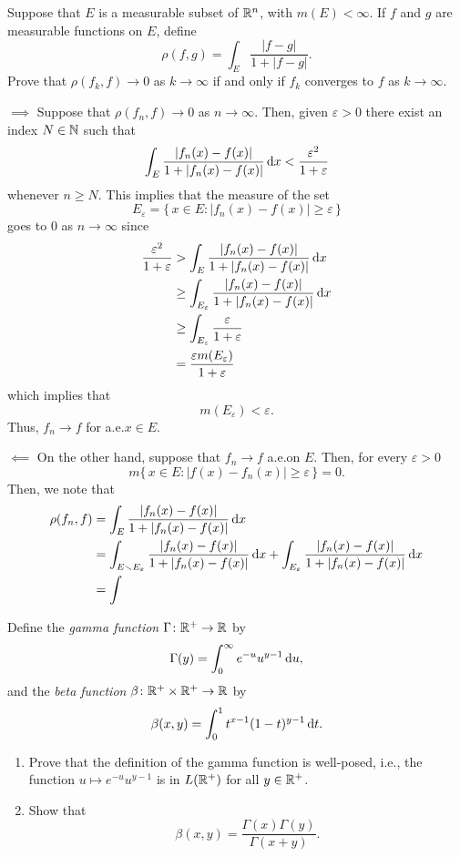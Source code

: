 \begin{problem}
  Suppose that \(E\) is a measurable subset of \(\mathbb{R}^n\), with
  \(m(E)<\infty\). If \(f\) and \(g\) are measurable functions on \(E\),
  define
  \[
    \rho(f,g)=\int_E\frac{|f-g|}{1+|f-g|}.
  \]
  Prove that \(\rho(f_k,f)\to 0\) as \(k\to\infty\) if and only if \(f_k\)
  converges to \(f\) as \(k\to\infty\).
\end{problem}
\begin{solution}
  \(\implies\) Suppose that \(\rho(f_n,f)\to 0\) as \(n\to\infty\). Then,
  given \(\varepsilon>0\) there exist an index \(N\in\mathbb{N}\) such that
  \[
    \int_E \frac{|f_n(x)-f(x)|}{1+|f_n(x)-f(x)|}\mathop{}\!\mathrm{d} x
    <\frac{\varepsilon^2}{1+\varepsilon}
  \]
  whenever \(n\geq N\). This implies that the measure of the set
  \[
    E_\varepsilon=\bigr\{\,x\in E:|f_n(x)-f(x)|\geq\varepsilon\,\bigl\}
  \]
  goes to \(0\) as \(n\to\infty\) since
  \begin{align*}
    \frac{\varepsilon^2}{1+\varepsilon}
    &>\int_E \frac{|f_n(x)-f(x)|}{1+|f_n(x)-f(x)|}\mathop{}\!\mathrm{d} x\\
    &\geq \int_{E_\varepsilon}
    \frac{|f_n(x)-f(x)|}{1+|f_n(x)-f(x)|}\mathop{}\!\mathrm{d} x\\
    &\geq\int_{E_\varepsilon}\frac{\varepsilon}{1+\varepsilon}\\
    &=\frac{\varepsilon m(E_\varepsilon)}{1+\varepsilon}
  \end{align*}
  which implies that
  \[
    m(E_\varepsilon)<\varepsilon.
  \]
  Thus, \(f_n\to f\) for a.e.\@ \(x\in E\).

  \(\impliedby\) On the other hand, suppose that \(f_n\to f\) a.e.\@ on
  \(E\). Then, for every \(\varepsilon>0\)
  \[
    m\bigl\{\,x\in E:|f(x)-f_n(x)|\geq\varepsilon\,\bigr\}=0.
  \]
  Then, we note that
  \begingroup
  \allowdisplaybreaks
  \begin{align*}
    \rho(f_n,f)
    &=\int_E \frac{|f_n(x)-f(x)|}{1+|f_n(x)-f(x)|}\mathop{}\!\mathrm{d} x\\
    &=\int_{E\smallsetminus E_\varepsilon} \frac{|f_n(x)-f(x)|}{1+|f_n(x)-f(x)|}\mathop{}\!\mathrm{d} x
      +\int_{E_\varepsilon} \frac{|f_n(x)-f(x)|}{1+|f_n(x)-f(x)|}\mathop{}\!\mathrm{d} x\\
    &=\int
  \end{align*}
  \endgroup
\end{solution}

\begin{problem}
  Define the \emph{gamma function} \(\Gamma\colon\mathbb{R}^+\to\mathbb{R}\) by
  \[
    \Gamma(y)=\int_0^\infty e^{-u}u^{y-1}\mathop{}\!\mathrm{d} u,
  \]
  and the \emph{beta function} \(\beta\colon\mathbb{R}^+\times\mathbb{R}^+\to\mathbb{R}\) by
  \[
    \beta(x,y)=\int_0^1 t^{x-1}(1-t)^{y-1}\mathop{}\!\mathrm{d} t.
  \]
  \begin{enumerate}[label=(\alph*)]
  \item Prove that the definition of the gamma function is well-posed,
    i.e., the function \(u\mapsto e^{-u}u^{y-1}\) is in \(L(\mathbb{R}^+)\) for
    all \(y\in\mathbb{R}^+\).
  \item Show that
    \[
      \beta(x,y)=\frac{\Gamma(x)\Gamma(y)}{\Gamma(x+y)}.
    \]
  \end{enumerate}
\end{problem}
\begin{solution}
\end{solution}

